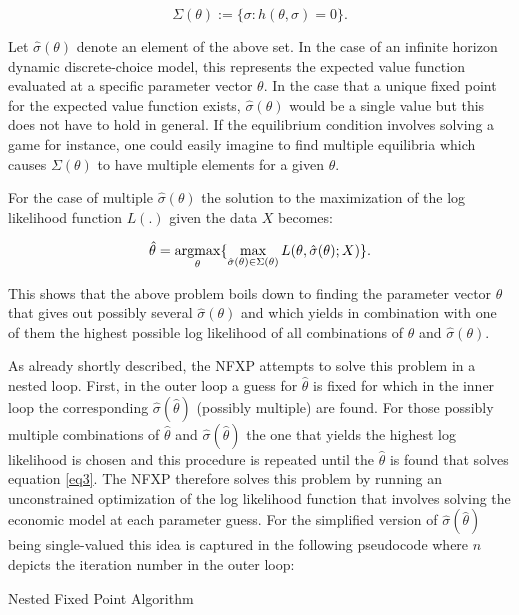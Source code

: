 \begin{equation}
\Sigma(\theta) := \{\sigma:h(\theta, \sigma)=0\}.
\end{equation}

Let $\hat{\sigma}(\theta)$ denote an element of the above set. In the case of an infinite horizon dynamic discrete-choice model, this represents the expected value function evaluated at a specific parameter vector $\theta$. In the case that a unique fixed point for the expected value function exists, $\hat{\sigma}(\theta)$ would be a single value but this does not have to hold in general. If the equilibrium condition involves solving a game for instance, one could easily imagine to find multiple equilibria which causes $\Sigma(\theta)$ to have multiple elements for a given $\theta$.

For the case of multiple $\hat{\sigma}(\theta)$ the solution to the maximization of the log likelihood function $L(.)$ given the data $X$ becomes:

\begin{equation}
\hat\theta = \operatorname*{argmax}_{\theta} \{ \max_{\hat\sigma(\theta)\in\Sigma(\theta)} L(\theta,\hat\sigma(\theta); X)\}.
\label{eq3}
\end{equation}

This shows that the above problem boils down to finding the parameter vector $\theta$ that gives out possibly several $\hat{\sigma}(\theta)$ and which yields in combination with one of them the highest possible log likelihood of all combinations of $\theta$ and $\hat{\sigma}(\theta)$.

As already shortly described, the NFXP attempts to solve this problem in a nested loop. First, in the outer loop a guess for $\hat{\theta}$ is fixed for which in the inner loop the corresponding $\hat{\sigma}(\hat\theta)$ (possibly multiple) are found. For those possibly multiple combinations of $\hat\theta$ and $\hat\sigma(\hat\theta)$ the one that yields the highest log likelihood is chosen and this procedure is repeated until the $\hat{\theta}$ is found that solves equation \ref{eq3}. The NFXP therefore solves this problem by running an unconstrained optimization of the log likelihood function that involves solving the economic model at each parameter guess. For the simplified version of $\hat{\sigma}(\hat\theta)$ being single-valued this idea is captured in the following pseudocode where $n$ depicts the iteration number in the outer loop:

\vspace{2ex}
\begin{algorithm}[H]
	\SetAlgoLined
	\caption{Nested Fixed Point Algorithm}
\end{algorithm}
\vspace{2ex}

